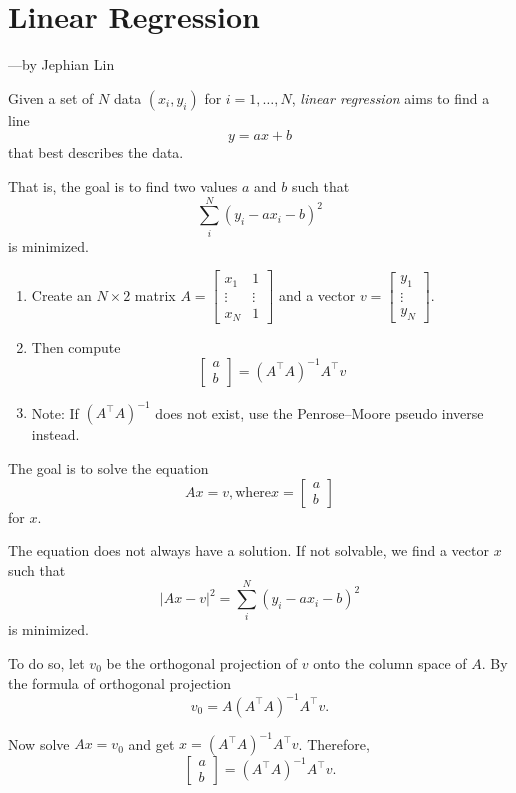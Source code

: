 \documentclass[SageableMath-2019SMath316.tex]{subfiles}
\begin{document}
\section{Linear Regression}
\begin{flushright}
---by Jephian Lin
\end{flushright}

Given a set of $N$ data $(x_i,y_i)$ for $i=1,\ldots,N$,
\emph{linear regression} aims to find a line 
\[ y=ax+b \]
that best describes the data.  

That is, the goal is  
to find two values $a$ and $b$ such that  
\[ \sum_i^N (y_i - ax_i - b)^2 \]
is minimized. 

\begin{enumerate}
\item Create an $N\times 2$ matrix $A=\begin{bmatrix}x_1 & 1 \\ \vdots & \vdots \\ x_N & 1 \end{bmatrix}$ and a vector $v=\begin{bmatrix}y_1 \\ \vdots \\ y_N \end{bmatrix}$.
\item Then compute 
\[ \begin{bmatrix} a \\ b \end{bmatrix} = (A^\top A)^{-1} A^\top v \]
\item[] Note: If $(A^\top A)^{-1}$ does not exist, use the Penrose--Moore pseudo inverse instead.
\end{enumerate}

The goal is to solve the equation 
\[ Ax = v, \text{where} x = \begin{bmatrix} a \\ b \end{bmatrix} \]
for $x$.  

The equation does not always have a solution.  
If not solvable, we find a vector $x$ such that 
\[ |Ax-v|^2 = \sum_i^N (y_i - ax_i - b)^2 \]
is minimized.  

To do so, let $v_0$ be the orthogonal projection of $v$ onto the column space of $A$.  
By the formula of orthogonal projection 
\[ v_0 = A(A^\top A)^{-1}A^\top v. \]

Now solve $Ax=v_0$ and get $x=(A^\top A)^{-1}A^\top v$.  
Therefore,  
\[ \begin{bmatrix} a \\ b \end{bmatrix} = (A^\top A)^{-1}A^\top v. \]
\end{document}
